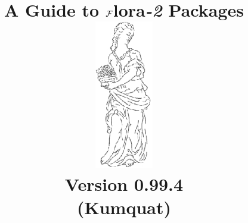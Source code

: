 \documentclass[11pt]{report}
\begin{document}
\newcommand{\FLORA}{{\mbox{\sc ${\cal F}${lora}\rm\emph{-2}}}\xspace}
\newcommand{\fl}{F-logic }

\newcommand{\fd}{{\mbox{\tt \,->\,}}}                   %
\newcommand{\bfd}{{\mbox{\tt \,*->\,}}}            %
\newcommand{\mvd}{{\mbox{\tt \,->\,}}}  %
\newcommand{\bmvd}{{\mbox{\tt \,*->\,}}}              %
\newcommand{\Fd}{{\mbox{\tt \,=>\,}}}                      %
\newcommand{\Mvd}{{\mbox{\tt \,=>\,}}}  %
\newcommand{\bFd}{{\mbox{\tt \,*=>\,}}}                      %
\newcommand{\bMvd}{{\mbox{\tt \,*=>\,}}}  %
\newcommand{\thismodule}{{\tt \_@}\xspace}

\def\Protege{Prot\'{e}g\'{e} }
\def\NoProtege{Prot\'{e}g\'{e}}

\title{\bf A Guide to \FLORA Packages
        \vspace{0.7cm}\\
 \includegraphics[width=1in]{floralogo} 
           \vspace{3mm}\\
       {\Large Version 0.99.4}
       \\
       {\large (Kumquat)}
}


\maketitle


\thispagestyle{empty}
\newpage
\thispagestyle{empty}

\tableofcontents
\newpage        %
  




\end{document}
